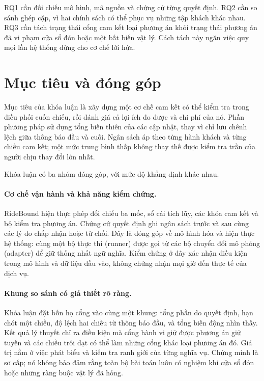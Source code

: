RQ1 cần đối chiếu mô hình, mã nguồn và chứng cứ từng quyết định. RQ2 cần so sánh ghép cặp,
vì hai chính sách có thể phục vụ những tập khách khác nhau. RQ3 cần tách trạng thái cổng
cam kết loại phương án khỏi trạng thái phương án đã vi phạm cửa sổ đón hoặc một bất biến
vật lý. Cách tách này ngăn việc quy mọi lần hệ thống dừng cho cơ chế lời hứa.

\section{Mục tiêu và đóng góp}

Mục tiêu của khóa luận là xây dựng một cơ chế cam kết có thể kiểm tra trong điều phối cuốn
chiếu, rồi đánh giá cả lợi ích đo được và chi phí của nó. Phần phương pháp sử dụng tổng biến
thiên của các cập nhật, thay vì chỉ lưu chênh lệch giữa thông báo đầu và cuối. Ngân sách áp
theo từng hành khách và từng chiều cam kết; một mức trung bình thấp không thay thế được
kiểm tra trần của người chịu thay đổi lớn nhất.

Khóa luận có ba nhóm đóng góp, với mức độ khẳng định khác nhau.

\paragraph{Cơ chế vận hành và khả năng kiểm chứng.}
RideBound hiện thực phép đối chiếu ba mốc, sổ cái tích lũy, các khóa cam kết và bộ kiểm tra
phương án. Chứng cứ quyết định ghi ngân sách trước và sau cùng các lý do chấp nhận hoặc
từ chối. Đây là đóng góp về mô hình hóa và hiện thực hệ thống: cùng một bộ thực thi (runner)
được gọi từ các bộ chuyển đổi mô phỏng (adapter) để giữ thống nhất ngữ nghĩa. Kiểm chứng ở đây xác nhận điều kiện
trong mô hình và dữ liệu đầu vào, không chứng nhận mọi giờ đến thực tế của dịch vụ.

\paragraph{Khung so sánh có giả thiết rõ ràng.}
Khóa luận đặt bốn họ cổng vào cùng một khung: tổng phần do quyết định, hạn chót một chiều,
độ lệch hai chiều từ thông báo đầu, và tổng biến động nhìn thấy. Kết quả lý thuyết chỉ ra
điều kiện mà cổng hành vi giữ được phương án giữ tuyến và các chiều trôi dạt có thể làm
những cổng khác loại phương án đó. Giá trị nằm ở việc phát biểu và kiểm tra ranh giới của
từng nghĩa vụ. Chứng minh là sơ cấp; nó không bảo đảm rằng toàn bộ bài toán luôn có nghiệm
khi cửa sổ đón hoặc những ràng buộc vật lý đã hỏng.

